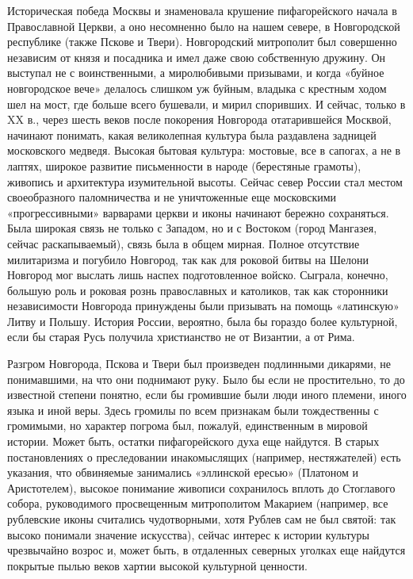 Историческая  победа  Москвы  и  знаменовала  крушение  пифагорейского
начала в Православной  Церкви, а оно несомненно было  на нашем севере,
в  Новгородской  республике  (также   Пскове  и  Твери).  Новгородский
митрополит  был  совершенно независим  от  князя  и посадника  и  имел
даже  свою собственную  дружину.  Он выступал  не  с воинственными,  а
миролюбивыми призывами,  и когда  «буйное новгородское  вече» делалось
слишком уж  буйным, владыка с крестным  ходом шел на мост,  где больше
всего  бушевали,  и  мирил  споривших.  И  сейчас,  только  в  XX  в.,
через  шесть веков  после покорения  Новгорода отатарившейся  Москвой,
начинают  понимать,   какая  великолепная  культура   была  раздавлена
задницей московского медведя. Высокая  бытовая культура: мостовые, все
в  сапогах, а  не в  лаптях,  широкое развитие  письменности в  народе
(берестяные  грамоты),  живопись  и архитектура  изумительной  высоты.
Сейчас  север  России стал  местом  своеобразного  паломничества и  не
уничтоженные еще московскими «прогрессивными» варварами церкви и иконы
начинают бережно сохраняться. Была широкая  связь не только с Западом,
но и с  Востоком (город Мангазея, сейчас раскапываемый),  связь была в
общем мирная.  Полное отсутствие милитаризма и  погубило Новгород, так
как  для роковой  битвы на  Шелони  Новгород мог  выслать лишь  наспех
подготовленное войско. Сыграла, конечно,  большую роль и роковая рознь
православных и  католиков, так как сторонники  независимости Новгорода
принуждены  были  призывать  на  помощь «латинскую»  Литву  и  Польшу.
История России,  вероятно, была бы  гораздо более культурной,  если бы
старая Русь получила христианство не от Византии, а от Рима.

Разгром Новгорода, Пскова и  Твери был произведен подлинными дикарями,
не  понимавшими,  на   что  они  поднимают  руку.  Было   бы  если  не
простительно,  то  до известной  степени  понятно,  если бы  громившие
были  люди иного  племени,  иного  языка и  иной  веры. Здесь  громилы
по  всем   признакам  были  тождественны  с   громимыми,  но  характер
погрома  был, пожалуй,  единственным  в мировой  истории. Может  быть,
остатки пифагорейского  духа еще  найдутся. В старых  постановлениях о
преследовании  инакомыслящих (например,  нестяжателей) есть  указания,
что обвиняемые занимались «эллинской ересью» (Платоном и Аристотелем),
высокое понимание  живописи сохранилось  вплоть до  Стоглавого собора,
руководимого   просвещенным  митрополитом   Макарием  (например,   все
рублевские  иконы  считались  чудотворными,  хотя Рублев  сам  не  был
святой:  так высоко  понимали  значение искусства),  сейчас интерес  к
истории  культуры  чрезвычайно  возрос  и, может  быть,  в  отдаленных
северных  уголках еще  найдутся  покрытые пылью  веков хартии  высокой
культурной ценности.

